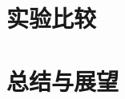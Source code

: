 \documentclass[final]{cvpr}
\begin{document}
\section{实验比较}\label{sec:Experiment}




\section{总结与展望}\label{sec:Conclusion}




% 
% 

\end{document}
